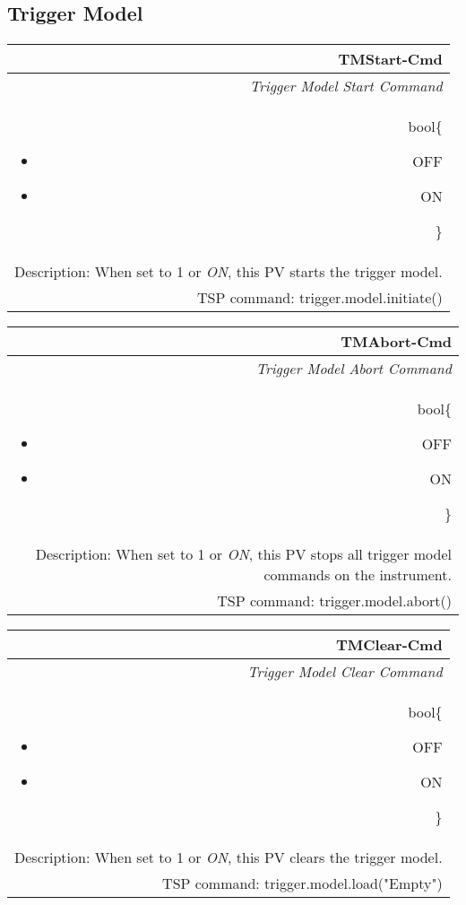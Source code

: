 \documentclass[openany]{article}
\begin{document}
	\subsection{Trigger Model}\label{pvgroup:trigger-model}

		\paragraph{} %

		\begin{tabular}{N}
			\hline
			\bfseries TMStart-Cmd\label{pv:tmstart-cmd} \\ \hline
			\emph{Trigger Model Start Command} \\
			bool\{\begin{itemize}[noitemsep]
				\small
				\item[] OFF
				\item[] ON
			\end{itemize}\} \\
			Description: When set to 1 or \emph{ON}, this PV starts the trigger model. \\
			TSP command: trigger.model.initiate()
		\end{tabular}

		\begin{tabular}{N}
			\hline
			\bfseries TMAbort-Cmd\label{pv:tmabort-cmd} \\ \hline
			\emph{Trigger Model Abort Command} \\
			bool\{\begin{itemize}[noitemsep]
				\small
				\item[] OFF
				\item[] ON
			\end{itemize}\} \\
			Description: When set to 1 or \emph{ON}, this PV stops all trigger model commands on the instrument. \\
			TSP command: trigger.model.abort()
		\end{tabular}

		\begin{tabular}{N}
			\hline
			\bfseries TMClear-Cmd\label{pv:tmclear-cmd} \\ \hline
			\emph{Trigger Model Clear Command} \\
			bool\{\begin{itemize}[noitemsep]
				\small
				\item[] OFF
				\item[] ON
			\end{itemize}\} \\
			Description: When set to 1 or \emph{ON}, this PV clears the trigger model. \\
			TSP command: trigger.model.load("Empty")
		\end{tabular}
\end{document}
